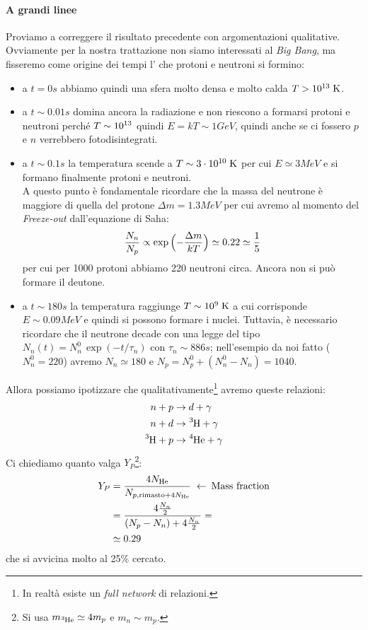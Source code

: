 \paragraph{A grandi linee}\label{a.grandi.linee} Proviamo a correggere il risultato precedente con argomentazioni qualitative. Ovviamente per la nostra trattazione non siamo interessati al \textit{Big Bang}, ma fisseremo come origine dei tempi l' che protoni e neutroni si formino: 
\begin{itemize}
    \item a $t=0\unit{s}$ abbiamo quindi una sfera molto densa e molto calda $T>10^{13}\;\mbox{K}$.  
    \item a $t\sim 0.01\unit{s}$ domina ancora la radiazione e non riescono a formarsi protoni e neutroni perché $T\sim10^{13}$ quindi $E=kT\sim 1\unit{GeV}$, quindi anche se ci fossero $p$ e $n$ verrebbero fotodisintegrati.
    \item a $t\sim 0.1\unit{s}$ la temperatura scende a $T\sim 3\cdot10^{10}\;\mbox{K}$ per cui $E\simeq 3\unit{MeV}$ e si formano finalmente protoni e neutroni.\\ 
    A questo punto è fondamentale ricordare che la massa del neutrone è maggiore di quella del protone $\Delta m = 1.3\unit{MeV}$ per cui avremo al momento del \textit{Freeze-out} dall'equazione di Saha:
    $$\frac{N_n}{N_p}\propto \exp{\Bigl ( -\frac{\Delta m}{kT} \Bigr )} \simeq 0.22 \simeq \frac{1}{5}$$
    per cui per 1000 protoni abbiamo 220 neutroni circa. Ancora non si può formare il deutone.
    \item a $t\sim 180\unit{s}$ la temperatura raggiunge $T\sim 10^{9}\;\mbox{K}$ a cui corrisponde $E\sim 0.09\unit{MeV}$ e quindi si possono formare i nuclei. Tuttavia, è necessario ricordare che il neutrone decade con una legge del tipo $N_n(t) = N_n^0 \, \exp{(-t/\tau_n)}$ con $\tau_n \sim 886\unit{s}$; nell'esempio da noi fatto ($N_n^0= 220$) avremo $N_n \simeq 180$ e $N_p = N_p^0 + (N_n^0-N_n) = 1040$.
\end{itemize}
\noindent Allora possiamo ipotizzare che qualitativamente\footnote{In realtà esiste un \textit{full network} di relazioni.} avremo queste relazioni:
\begin{displaymath}
\begin{aligned}
n + p &\to d + \gamma \\
n + d &\to \ce{^3H} + \gamma \\
\ce{^3H} + p &\to \ce{^4He} + \gamma
\end{aligned}
\end{displaymath}
Ci chiediamo quanto valga $Y_P$\footnote{Si usa $m_{\ce{^3He}}\simeq 4 m_p$ e $m_n \sim m_p$.}:
\begin{displaymath}
\begin{aligned}
Y_P &= \frac{4 N_{\ce{He}}}{N_{p,\text{rimasto} + 4N_{\ce{He}} }} \;\leftarrow\: \text{Mass fraction}\\
&= \frac{4 \frac{N_n}{2}}{(N_p - N_n) + 4\frac{N_n}{2}} = \\
&\simeq 0.29
\end{aligned}
\end{displaymath}
che si avvicina molto al 25\% cercato.




    